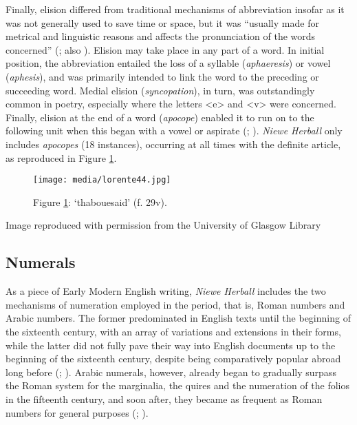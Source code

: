 \documentclass{article}
\begin{document}
Finally, elision differed from traditional mechanisms of abbreviation
insofar as it was not generally used to save time or space, but it
was ``usually made for metrical and linguistic reasons and affects the
pronunciation of the words concerned'' (\cite[121]{tannenbaum_handwriting_1930}; also \cite[25]{petti_english_1977}). Elision may take place in any part of a word. In initial
position, the abbreviation entailed the loss of a syllable (\emph{aphaeresis}) or vowel (\emph{aphesis}), and was primarily
intended to link the word to the preceding or succeeding word. Medial
elision (\emph{syncopation}), in turn, was outstandingly common in
poetry, especially where the letters \textless e\textgreater{} and
\textless v\textgreater{} were concerned. Finally, elision at the end of
a word (\emph{apocope}) enabled it to run on to the following unit
when this began with a vowel or aspirate (\cite[121--124]{tannenbaum_handwriting_1930};
\cite[25]{petti_english_1977}). \emph{Niewe Herball} only includes \emph{apocopes} (18
instances), occurring at all times with the definite article, as
reproduced in Figure \ref{fig:lorente44}.

\begin{figure}[H]
  \centering
    \texttt{[image: media/lorente44.jpg]}
    \caption{Figure \ref{fig:lorente44}: `thabouesaid' (f. 29v).}
    \label{fig:lorente44}
    \end{figure}


 Image reproduced with permission from the University of Glasgow Library 


 
\subsection{Numerals}\label{sec:numerals}

As a piece of Early Modern English writing, \emph{Niewe Herball}
includes the two mechanisms of numeration employed in the period, that
is, Roman numbers and Arabic numbers. The former predominated in English
texts until the beginning of the sixteenth century, with an array of
variations and extensions in their forms, while the latter did not fully
pave their way into English documents up to the beginning of the
sixteenth century, despite being comparatively popular abroad long
before (\cite[266]{jenkinson_use_1926}; \citep[28]{petti_english_1977}). Arabic numerals, however,
already began to gradually surpass the Roman system for the marginalia, the
quires and the numeration of the folios in the fifteenth
century, and soon after, they became as frequent as Roman numbers for
general purposes (\cite[153]{tannenbaum_handwriting_1930}; \cite[28]{petti_english_1977}).
\end{document}

